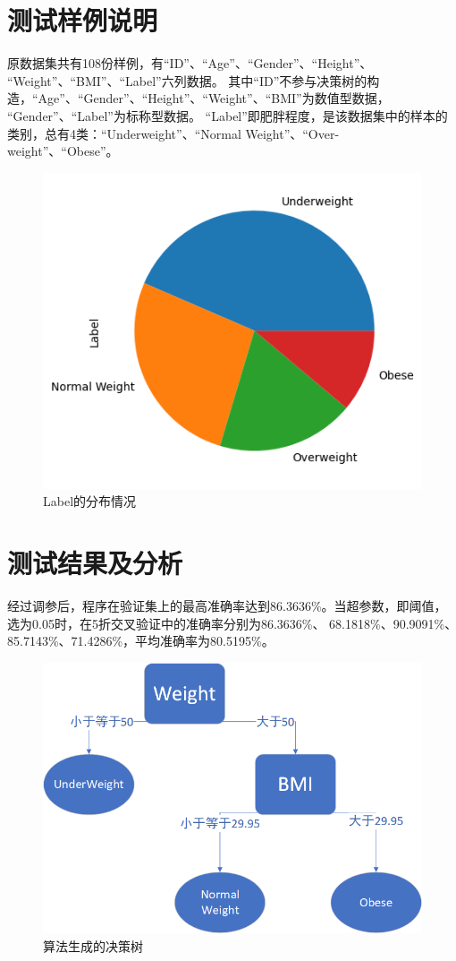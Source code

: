\documentclass[a4paper,11pt]{article}%
\theoremstyle{remark}
\theoremstyle{remark}
\theoremstyle{definition}
\theoremstyle{definition}
\theoremstyle{definition}
\begin{document}
\section{测试样例说明}
原数据集共有108份样例，有“ID”、“Age”、“Gender”、“Height”、\\
“Weight”、“BMI”、“Label”六列数据。
其中“ID”不参与决策树的构造，“Age”、“Gender”、“Height”、“Weight”、“BMI”为数值型数据，\\
“Gender”、“Label”为标称型数据。
“Label”即肥胖程度，是该数据集中的样本的类别，总有4类：“Underweight”、“Normal Weight”、“Over-\\
weight”、“Obese”。
\begin{figure}[htbp]
    \centering
    \includegraphics[scale=0.8]{output.png}
    \caption{Label的分布情况}
\end{figure}
\section{测试结果及分析}
经过调参后，程序在验证集上的最高准确率达到86.3636\%。当超参数，即阈值，选为0.05时，在5折交叉验证中的准确率分别为86.3636\%、
68.1818\%、90.9091\%、85.7143\%、71.4286\%，平均准确率为80.5195\%。
\begin{figure}[htbp]
    \centering
    \includegraphics[scale=0.425]{tree.png}
    \caption{算法生成的决策树}
\end{figure}
\end{document}

